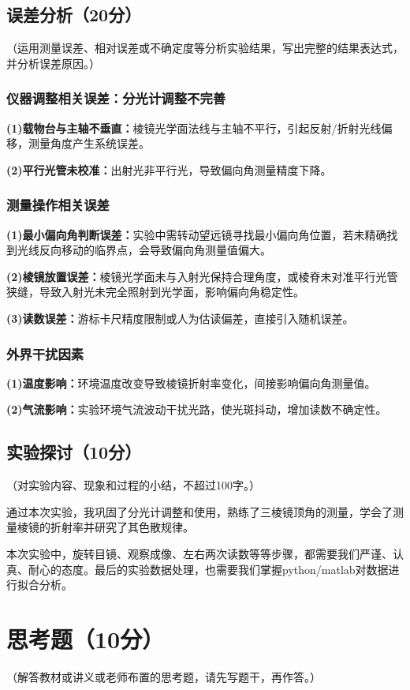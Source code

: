 \documentclass[]{../../templates/Report}%
\begin{document}
\begin{fullreportonly}
\subsection{误差分析（20分）}
（运用测量误差、相对误差或不确定度等分析实验结果，写出完整的结果表达式，并分析误差原因。）
\subsubsection{仪器调整相关误差：分光计调整不完善}
\textbf{(1)载物台与主轴不垂直：}棱镜光学面法线与主轴不平行，引起反射/折射光线偏移，测量角度产生系统误差。
\par
\textbf{(2)平行光管未校准：}出射光非平行光，导致偏向角测量精度下降。

\subsubsection{测量操作相关误差}
\textbf{(1)最小偏向角判断误差：}实验中需转动望远镜寻找最小偏向角位置，若未精确找到光线反向移动的临界点，会导致偏向角测量值偏大。
\par
\textbf{(2)棱镜放置误差：}棱镜光学面未与入射光保持合理角度，或棱脊未对准平行光管狭缝，导致入射光未完全照射到光学面，影响偏向角稳定性。
\par
\textbf{(3)读数误差：}游标卡尺精度限制或人为估读偏差，直接引入随机误差。

\subsubsection{外界干扰因素}
\textbf{(1)温度影响：}环境温度改变导致棱镜折射率变化，间接影响偏向角测量值。
\par
\textbf{(2)气流影响：}实验环境气流波动干扰光路，使光斑抖动，增加读数不确定性。



\subsection{实验探讨（10分）}
（对实验内容、现象和过程的小结，不超过100字。）
\par
通过本次实验，我巩固了分光计调整和使用，熟练了三棱镜顶角的测量，学会了测量棱镜的折射率并研究了其色散规律。
\par
本次实验中，旋转目镜、观察成像、左右两次读数等等步骤，都需要我们严谨、认真、耐心的态度。最后的实验数据处理，也需要我们掌握python/matlab对数据进行拟合分析。



\section{思考题（10分）}
（解答教材或讲义或老师布置的思考题，请先写题干，再作答。）

\end{fullreportonly}
\end{document}
